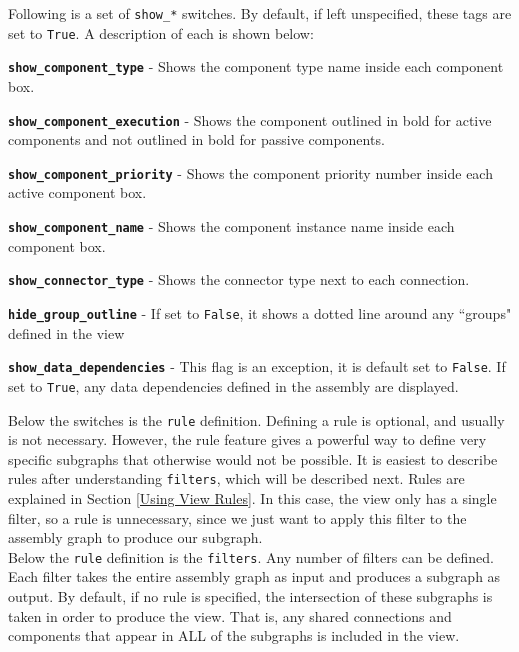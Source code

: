 Following is a set of \texttt{show\_*} switches. By default, if left unspecified, these tags are set to \texttt{True}. A description of each is shown below:

\vspace{5mm} %
\begin{spaceditemize}
  \item \textbf{\texttt{show\_component\_type}} - Shows the component type name inside each component box.
  \item \textbf{\texttt{show\_component\_execution}} - Shows the component outlined in bold for active components and not outlined in bold for passive components.
  \item \textbf{\texttt{show\_component\_priority}} - Shows the component priority number inside each active component box.
  \item \textbf{\texttt{show\_component\_name}} - Shows the component instance name inside each component box.
  \item \textbf{\texttt{show\_connector\_type}} - Shows the connector type next to each connection.
  \item \textbf{\texttt{hide\_group\_outline}} - If set to \texttt{False}, it shows a dotted line around any ``groups" defined in the view
  \item \textbf{\texttt{show\_data\_dependencies}} - This flag is an exception, it is default set to \texttt{False}. If set to \texttt{True}, any data dependencies defined in the assembly are displayed.
\end{spaceditemize}
\vspace{5mm} %

Below the switches is the \texttt{rule} definition. Defining a rule is optional, and usually is not necessary. However, the rule feature gives a powerful way to define very specific subgraphs that otherwise would not be possible. It is easiest to describe rules after understanding \texttt{filters}, which will be described next. Rules are explained in Section \ref{Using View Rules}. In this case, the view only has a single filter, so a rule is unnecessary, since we just want to apply this filter to the assembly graph to produce our subgraph. \\

Below the \texttt{rule} definition is the \texttt{filters}. Any number of filters can be defined. Each filter takes the entire assembly graph as input and produces a subgraph as output. By default, if no rule is specified, the intersection of these subgraphs is taken in order to produce the view. That is, any shared connections and components that appear in ALL of the subgraphs is included in the view. \\


